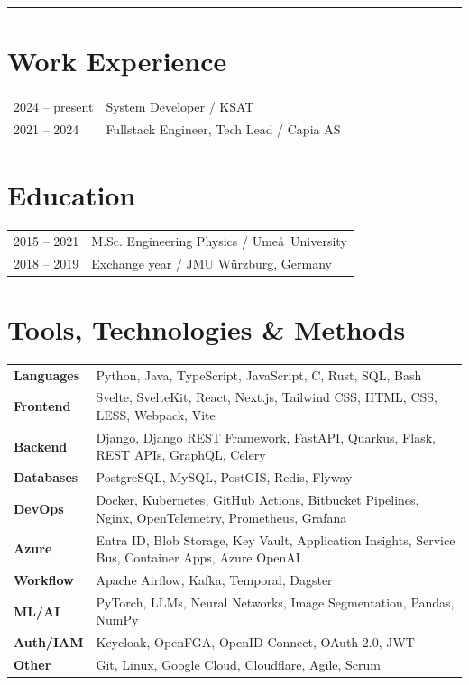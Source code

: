 \documentclass[10pt, a4paper]{article}
\begin{document}
\vspace{0.5em}
\noindent\rule{\linewidth}{0.5pt}

\begin{minipage}[t]{0.48\textwidth}
\section*{Work Experience}
{\small
\begin{tabular}{@{}L{2.2cm}L{5cm}@{}}
2024 -- present & System Developer / KSAT \\
2021 -- 2024 & Fullstack Engineer, Tech Lead / Capia AS \\
\end{tabular}
}
\end{minipage}%
\hfill
\begin{minipage}[t]{0.48\textwidth}
\section*{Education}
{\small
\begin{tabular}{@{}L{2.2cm}L{5cm}@{}}
2015 -- 2021 & M.Sc. Engineering Physics / Ume\aa\ University \\
2018 -- 2019 & Exchange year / JMU W\"urzburg, Germany \\
\end{tabular}
}
\end{minipage}

\section*{Tools, Technologies \& Methods}
{\small
\begin{tabularx}{\textwidth}{@{}L{3.2cm}X@{}}
\textbf{Languages} & Python, Java, TypeScript, JavaScript, C, Rust, SQL, Bash \\
\textbf{Frontend} & Svelte, SvelteKit, React, Next.js, Tailwind CSS, HTML, CSS, LESS, Webpack, Vite \\
\textbf{Backend} & Django, Django REST Framework, FastAPI, Quarkus, Flask, REST APIs, GraphQL, Celery \\
\textbf{Databases} & PostgreSQL, MySQL, PostGIS, Redis, Flyway \\
\textbf{DevOps} & Docker, Kubernetes, GitHub Actions, Bitbucket Pipelines, Nginx, OpenTelemetry, Prometheus, Grafana \\
\textbf{Azure} & Entra ID, Blob Storage, Key Vault, Application Insights, Service Bus, Container Apps, Azure OpenAI \\
\textbf{Workflow} & Apache Airflow, Kafka, Temporal, Dagster \\
\textbf{ML/AI} & PyTorch, LLMs, Neural Networks, Image Segmentation, Pandas, NumPy \\
\textbf{Auth/IAM} & Keycloak, OpenFGA, OpenID Connect, OAuth 2.0, JWT \\
\textbf{Other} & Git, Linux, Google Cloud, Cloudflare, Agile, Scrum \\
\end{tabularx}
}
\end{document}
